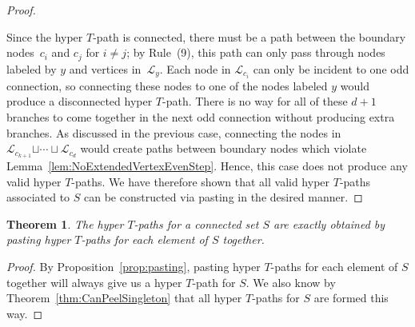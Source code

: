 \documentclass[10pt,a4paper]{amsart}
\numberwithin{equation}{section}
\newtheorem{Theorem}{Theorem}[section]
\newcommand{\new}[1]{{#1}}
\begin{document}
\begin{proof}
\begin{center}
\end{center}
Since the hyper $T$-path is connected, there must be a path between the boundary nodes~$c_i$ and $c_j$ for $i \neq j$; by Rule~(9), this path can only pass through nodes labeled by $y$ and vertices in~$\mathcal{L}_{y}$. Each node in $\mathcal{L}_{c_i}$ can only be incident to one odd connection, so connecting these nodes to one of the nodes labeled $y$ would produce a disconnected hyper $T$-path. There is no way for all of these $d+1$ branches to come together in the next odd connection without producing extra branches. As discussed in the previous case, connecting the nodes in $\mathcal{L}_{c_{k+1}} \new{\sqcup \cdots \sqcup} \mathcal{L}_{c_d}$ would create paths between boundary nodes which violate Lemma~\ref{lem:NoExtendedVertexEvenStep}. Hence, this case does not produce any valid hyper $T$-paths.
We have therefore shown that all valid hyper $T$-paths associated to $S$ can be constructed via pasting in the desired manner.
\end{proof}
\begin{Theorem}
The hyper $T$-paths for a connected set $S$ are exactly obtained by pasting hyper $T$-paths for each element of $S$ together.
\end{Theorem}
\begin{proof}
By Proposition~\ref{prop:pasting}, pasting hyper $T$-paths for each element of $S$ together will always give us a hyper $T$-path for $S$. We also know by Theorem~\ref{thm:CanPeelSingleton} that all hyper $T$-paths for $S$ are formed this way.
\end{proof}
\end{document}
